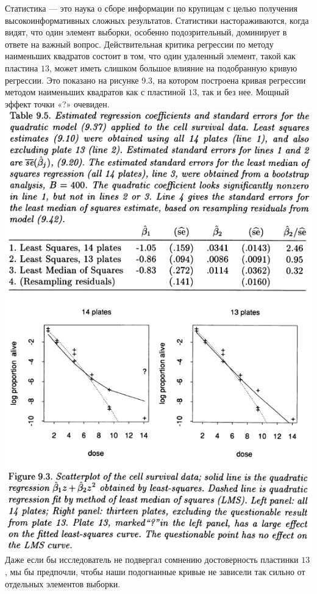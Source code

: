Статистика --- это наука о сборе информации по крупицам с целью получения высокоинформативных сложных результатов. Статистики настораживаются, когда видят, что один элемент выборки, особенно подозрительный, доминирует в ответе на важный вопрос. Действительная критика регрессии по методу наименьших квадратов состоит в том, что один удаленный элемент, такой как пластина $13$, может иметь слишком большое влияние на подобранную кривую регрессии. Это показано на рисунке 9.3, на котором построена кривая регрессии методом наименьших квадратов как с пластиной $13$, так и без нее. Мощный эффект точки «?» очевиден.
\noindent
\includegraphics[width=\linewidth]{9/t95f93}
\newpage
\noindent Даже если бы исследователь не подвергал сомнению достоверность пластинки $13$, мы бы предпочли, чтобы наши подогнанные кривые не зависели так сильно от отдельных элементов выборки.